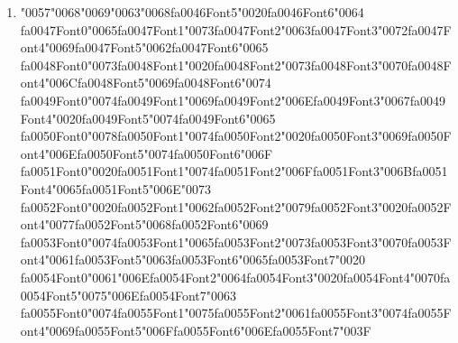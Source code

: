 \documentclass[11pt]{article}
\begin{document}
\begin{enumerate}[label=Q\arabic*., leftmargin=*]
\item {\char"0057}{\char"0068}{\char"0069}{\char"0063}{\char"0068}{\csname fa0046Font5\endcsname\char"0020}{\csname fa0046Font6\endcsname\char"0064} {\csname fa0047Font0\endcsname\char"0065}{\csname fa0047Font1\endcsname\char"0073}{\csname fa0047Font2\endcsname\char"0063}{\csname fa0047Font3\endcsname\char"0072}{\csname fa0047Font4\endcsname\char"0069}{\csname fa0047Font5\endcsname\char"0062}{\csname fa0047Font6\endcsname\char"0065} {\csname fa0048Font0\endcsname\char"0073}{\csname fa0048Font1\endcsname\char"0020}{\csname fa0048Font2\endcsname\char"0073}{\csname fa0048Font3\endcsname\char"0070}{\csname fa0048Font4\endcsname\char"006C}{\csname fa0048Font5\endcsname\char"0069}{\csname fa0048Font6\endcsname\char"0074} {\csname fa0049Font0\endcsname\char"0074}{\csname fa0049Font1\endcsname\char"0069}{\csname fa0049Font2\endcsname\char"006E}{\csname fa0049Font3\endcsname\char"0067}{\csname fa0049Font4\endcsname\char"0020}{\csname fa0049Font5\endcsname\char"0074}{\csname fa0049Font6\endcsname\char"0065} {\csname fa0050Font0\endcsname\char"0078}{\csname fa0050Font1\endcsname\char"0074}{\csname fa0050Font2\endcsname\char"0020}{\csname fa0050Font3\endcsname\char"0069}{\csname fa0050Font4\endcsname\char"006E}{\csname fa0050Font5\endcsname\char"0074}{\csname fa0050Font6\endcsname\char"006F} {\csname fa0051Font0\endcsname\char"0020}{\csname fa0051Font1\endcsname\char"0074}{\csname fa0051Font2\endcsname\char"006F}{\csname fa0051Font3\endcsname\char"006B}{\csname fa0051Font4\endcsname\char"0065}{\csname fa0051Font5\endcsname\char"006E}{\char"0073} {\csname fa0052Font0\endcsname\char"0020}{\csname fa0052Font1\endcsname\char"0062}{\csname fa0052Font2\endcsname\char"0079}{\csname fa0052Font3\endcsname\char"0020}{\csname fa0052Font4\endcsname\char"0077}{\csname fa0052Font5\endcsname\char"0068}{\csname fa0052Font6\endcsname\char"0069} {\csname fa0053Font0\endcsname\char"0074}{\csname fa0053Font1\endcsname\char"0065}{\csname fa0053Font2\endcsname\char"0073}{\csname fa0053Font3\endcsname\char"0070}{\csname fa0053Font4\endcsname\char"0061}{\csname fa0053Font5\endcsname\char"0063}{\csname fa0053Font6\endcsname\char"0065}{\csname fa0053Font7\endcsname\char"0020} {\csname fa0054Font0\endcsname\char"0061}{\char"006E}{\csname fa0054Font2\endcsname\char"0064}{\csname fa0054Font3\endcsname\char"0020}{\csname fa0054Font4\endcsname\char"0070}{\csname fa0054Font5\endcsname\char"0075}{\char"006E}{\csname fa0054Font7\endcsname\char"0063} {\csname fa0055Font0\endcsname\char"0074}{\csname fa0055Font1\endcsname\char"0075}{\csname fa0055Font2\endcsname\char"0061}{\csname fa0055Font3\endcsname\char"0074}{\csname fa0055Font4\endcsname\char"0069}{\csname fa0055Font5\endcsname\char"006F}{\csname fa0055Font6\endcsname\char"006E}{\csname fa0055Font7\endcsname\char"003F}\\[0.25em]

\end{enumerate}
\end{document}
